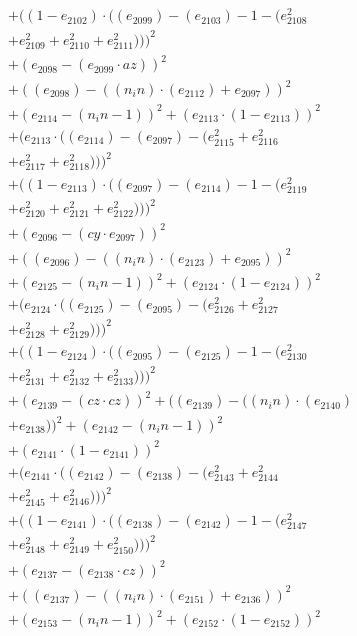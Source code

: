\documentclass[10pt, a4paper]{article}
\begin{document}
\begin{align*}
& + ((1 - e_{2102})  \cdot  ((e_{2099}) - (e_{2103}) - 1 - (e_{2108}^{2} \\
& + e_{2109}^{2} + e_{2110}^{2} + e_{2111}^{2})))^{2} \\
& + (e_{2098} - (e_{2099}  \cdot  az))^{2} \\
& + ((e_{2098}) - ((n_in)  \cdot  (e_{2112}) + e_{2097}))^{2} \\
& + (e_{2114} - (n_in - 1))^{2} + (e_{2113}  \cdot  (1 - e_{2113}))^{2} \\
& + (e_{2113}  \cdot  ((e_{2114}) - (e_{2097}) - (e_{2115}^{2} + e_{2116}^{2} \\
& + e_{2117}^{2} + e_{2118}^{2})))^{2} \\
& + ((1 - e_{2113})  \cdot  ((e_{2097}) - (e_{2114}) - 1 - (e_{2119}^{2} \\
& + e_{2120}^{2} + e_{2121}^{2} + e_{2122}^{2})))^{2} \\
& + (e_{2096} - (cy  \cdot  e_{2097}))^{2} \\
& + ((e_{2096}) - ((n_in)  \cdot  (e_{2123}) + e_{2095}))^{2} \\
& + (e_{2125} - (n_in - 1))^{2} + (e_{2124}  \cdot  (1 - e_{2124}))^{2} \\
& + (e_{2124}  \cdot  ((e_{2125}) - (e_{2095}) - (e_{2126}^{2} + e_{2127}^{2} \\
& + e_{2128}^{2} + e_{2129}^{2})))^{2} \\
& + ((1 - e_{2124})  \cdot  ((e_{2095}) - (e_{2125}) - 1 - (e_{2130}^{2} \\
& + e_{2131}^{2} + e_{2132}^{2} + e_{2133}^{2})))^{2} \\
& + (e_{2139} - (cz  \cdot  cz))^{2} + ((e_{2139}) - ((n_in)  \cdot  (e_{2140}) \\
& + e_{2138}))^{2} + (e_{2142} - (n_in - 1))^{2} \\
& + (e_{2141}  \cdot  (1 - e_{2141}))^{2} \\
& + (e_{2141}  \cdot  ((e_{2142}) - (e_{2138}) - (e_{2143}^{2} + e_{2144}^{2} \\
& + e_{2145}^{2} + e_{2146}^{2})))^{2} \\
& + ((1 - e_{2141})  \cdot  ((e_{2138}) - (e_{2142}) - 1 - (e_{2147}^{2} \\
& + e_{2148}^{2} + e_{2149}^{2} + e_{2150}^{2})))^{2} \\
& + (e_{2137} - (e_{2138}  \cdot  cz))^{2} \\
& + ((e_{2137}) - ((n_in)  \cdot  (e_{2151}) + e_{2136}))^{2} \\
& + (e_{2153} - (n_in - 1))^{2} + (e_{2152}  \cdot  (1 - e_{2152}))^{2} \\

\end{align*}
\end{document}
